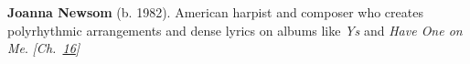 \textbf{Joanna Newsom} (b. 1982). American harpist and composer who creates polyrhythmic arrangements and dense lyrics on albums like \emph{Ys} and \emph{Have One on Me}. \emph{[Ch.~\hyperref[ch:falsevacuumthreat]{16}]}

